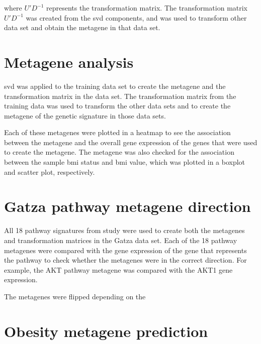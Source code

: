 \noindent
where $U'D^{-1}$ represents the transformation matrix.
The transformation matrix $U'D^{-1}$ was created from the \gls{svd} components, and was used to transform other data set and obtain the metagene in that data set.

\section{Metagene analysis}
\label{sec:metagene_analysis}

\gls{svd} was applied to the training data set to create the metagene and the transformation matrix in the data set.
The transformation matrix from the training data was used to transform the other data sets and to create the metagene of the genetic signature in those data sets.

Each of these metagenes were plotted in a heatmap to see the association between the metagene and the overall gene expression of the genes that were used to create the metagene.
The metagene was also checked for the association between the sample \gls{bmi} status and \gls{bmi} value, which was plotted in a boxplot and scatter plot, respectively.

\section{Gatza pathway metagene direction}
\label{sec:pathway_metagene_direction}

All 18 pathway signatures from \citet{Gatza2010a} study were used to create both the metagenes and transformation matrices in the Gatza data set.
Each of the 18 pathway metagenes were compared with the gene expression of the gene that represents the pathway to check whether the metagenes were in the correct direction.
For example, the AKT pathway metagene was compared with the AKT1 gene expression.

The metagenes were flipped depending on the









\section{Obesity metagene prediction}
\label{sec:obesity_metagene_prediction}
















